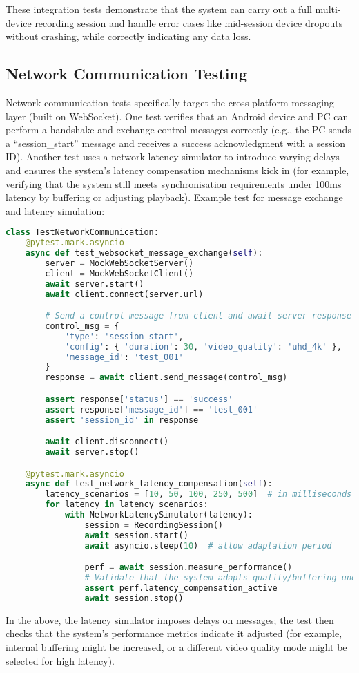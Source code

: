 \documentclass[11pt,a4paper]{report}
\begin{document}
These integration tests demonstrate that the system can carry out a full multi-device recording session and handle error cases like mid-session device dropouts without crashing, while correctly indicating any data loss.
\subsection{Network Communication Testing}
Network communication tests specifically target the cross-platform messaging layer (built on WebSocket). One test verifies that an Android device and PC can perform a handshake and exchange control messages correctly (e.g., the PC sends a “session\_start” message and receives a success acknowledgment with a session ID). Another test uses a network latency simulator to introduce varying delays and ensures the system’s latency compensation mechanisms kick in (for example, verifying that the system still meets synchronisation requirements under 100ms latency by buffering or adjusting playback).
Example test for message exchange and latency simulation:
\begin{lstlisting}[language=Python]
class TestNetworkCommunication:
    @pytest.mark.asyncio
    async def test_websocket_message_exchange(self):
        server = MockWebSocketServer()
        client = MockWebSocketClient()
        await server.start()
        await client.connect(server.url)

        # Send a control message from client and await server response
        control_msg = {
            'type': 'session_start',
            'config': { 'duration': 30, 'video_quality': 'uhd_4k' },
            'message_id': 'test_001'
        }
        response = await client.send_message(control_msg)

        assert response['status'] == 'success'
        assert response['message_id'] == 'test_001'
        assert 'session_id' in response

        await client.disconnect()
        await server.stop()

    @pytest.mark.asyncio
    async def test_network_latency_compensation(self):
        latency_scenarios = [10, 50, 100, 250, 500]  # in milliseconds
        for latency in latency_scenarios:
            with NetworkLatencySimulator(latency):
                session = RecordingSession()
                await session.start()
                await asyncio.sleep(10)  # allow adaptation period

                perf = await session.measure_performance()
                # Validate that the system adapts quality/buffering under latency
                assert perf.latency_compensation_active
                await session.stop()
\end{lstlisting}
In the above, the latency simulator imposes delays on messages; the test then checks that the system’s performance metrics indicate it adjusted (for example, internal buffering might be increased, or a different video quality mode might be selected for high latency).
\end{document}
